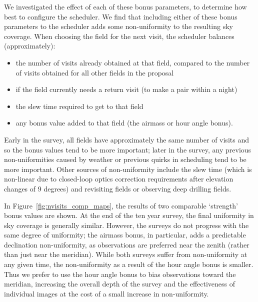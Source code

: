 \documentclass[DM,authoryear,toc]{lsstdoc}
\begin{document}
We investigated the effect of each of these bonus parameters, to determine how best to configure the scheduler. We find that including either of these bonus parameters to the scheduler adds some non-uniformity to the resulting sky coverage. When choosing the field for the next visit, the scheduler balances (approximately):
\begin{itemize}
\item the number of visits already obtained at that field, compared to the number of visits obtained for all other fields in the proposal
\item if the field currently needs a return visit (to make a pair within a night)
\item the slew time required to get to that field
\item any bonus value added to that field (the airmass or hour angle bonus).
\end{itemize}
Early in the survey, all fields have approximately the same number of visits and so the bonus values tend to be more important; later in the survey, any previous non-uniformities caused by weather or previous quirks in scheduling tend to be more important. Other sources of non-uniformity include the slew time (which is non-linear due to closed-loop optics correction requirements after elevation changes of 9 degrees) and revisiting fields or observing deep drilling fields.

In Figure~\ref{fig:nvisits_comp_maps}, the results of two comparable `strength' bonus values are shown. At the end of the ten year survey, the final uniformity in sky coverage is generally similar. However, the surveys do not progress with the same degree of uniformity; the airmass bonus, in particular, adds a predictable declination non-uniformity, as observations are preferred near the zenith (rather than just near the meridian). While both surveys suffer from non-uniformity at any given time, the non-uniformity as a result of the hour angle bonus is smaller. Thus we prefer to use the hour angle bonus to bias observations toward the meridian, increasing the overall depth of the survey and the effectiveness of individual images at the cost of a small increase in non-uniformity.
\end{document}
